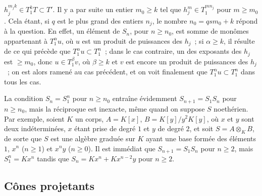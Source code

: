 $h_j^{m_jk}\in T_1^kT\subset T'$. Il y a par suite un entier $m_0\geq k$ tel
que $h_j^m\in T_1^{mn_j}$ pour $m\geq m_0$. Cela étant, si $q$ est le plus
grand des entiers $n_j$, le nombre $n_0=qsm_0+k$ répond à la question. En
effet, un élément de $S_n$, pour $n\geq n_0$, est somme de monômes appartenant
à $T_1^\alpha u$, où $u$ est un produit de puissances des $h_j$~; si
$\alpha\geq k$, il résulte de ce qui précède que $T_1^\alpha u\subset T_1^n$~;
dans le cas contraire, un des exposants des $h_j$ est $\geq m_0$, donc
$u\in T_1^\beta v$, où $\beta\geq k$ et $v$ est encore un produit de
puissances des $h_j$~; on est alors ramené au cas précédent, et on voit
finalement que $T_1^\alpha u\subset T_1^n$ dans tous les cas.

\begin{remark}[8.2.15]
\label{II.8.2.15-fr}
La condition $S_n=S_1^n$ pour $n\geq n_0$ entraîne évidemment
$S_{n+1}=S_1S_n$ pour $n\geq n_0$, mais la réciproque est inexacte, même
quand on suppose $S$ noethérien. Par exemple, soient $K$ un corps,
$A=K[x]$, $B=K[y]/y^2K[y]$, où $x$ et $y$ sont deux indéterminées, $x$ étant
prise de degré $1$ et $y$ de degré $2$, et soit $S=A\otimes_KB$, de sorte que
$S$ est une algèbre graduée sur $K$ ayant une base formée des éléments $1$,
$x^n$ ($n\geq1$) et $x^ny$ ($n\geq0$). Il est immédiat que
$S_{n+1}=S_1S_n$ pour $n\geq2$, mais $S_1^n=Kx^n$ tandis que
$S_n=Kx^n+Kx^{n-2}y$ pour $n\geq2$.
\end{remark}

\subsection{Cônes projetants}
\label{subsection:II.8.3-fr}

